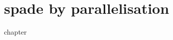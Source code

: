 \chapter{\texorpdfstring{\gls{spade}}{SPADe} by parallelisation}
\label{chap:parallelisation}
\glsresetall
{chapter}